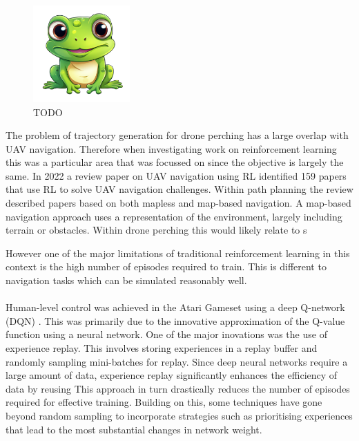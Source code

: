 \begin{figure}[htbp]
  \centering
  \includegraphics[width=0.33\textwidth]{frog.png}
  \caption{TODO}
\label{fig:rl-intro-drone}
\end{figure}

The problem of trajectory generation for drone perching has a large overlap with UAV navigation.
Therefore when investigating work on reinforcement learning this was a particular area that was focussed on since the objective is largely the same.
In 2022 a review paper\cite{aerialNavReview} on UAV navigation using RL identified 159 papers that use RL to solve UAV navigation challenges.
Within path planning the review described papers based on both mapless and map-based navigation.
A map-based navigation approach uses a representation of the environment, largely including terrain or obstacles.
Within drone perching this would likely relate to s 

However one of the major limitations of traditional reinforcement learning in this context is the high number of episodes required to train.
This is different to navigation tasks which can be simulated reasonably well. \\\\

Human-level control was achieved in the Atari Gameset using a deep Q-network (DQN) \cite{humanLevelControlDQN}.
This was primarily due to the innovative approximation of the Q-value function using a neural network.
One of the major inovations was the use of experience replay.
This involves storing experiences in a replay buffer and randomly sampling mini-batches for replay.
Since deep neural networks require a large amount of data, experience replay significantly enhances the efficiency of data by reusing
This approach in turn drastically reduces the number of episodes required for effective training.
Building on this, some techniques have gone beyond random sampling to incorporate strategies such as prioritising experiences that lead to the most substantial changes in network weight.

